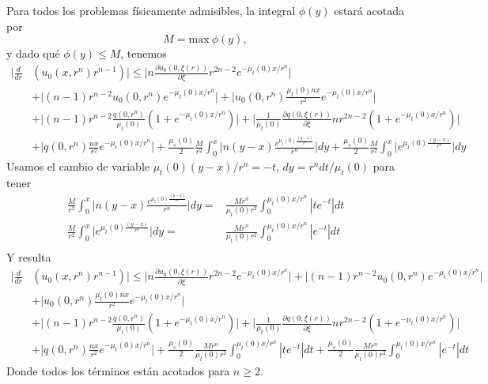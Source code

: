 Para todos los problemas físicamente admisibles, la 
integral $\phi(y)$ estará acotada por
\begin{equation}
M=\text{max}~\phi(y),
\end{equation}
y dado qué $\phi(y)\leq M$, tenemos
\begin{equation}
\begin{split}
 \Bigg| \frac{d }{dr}& \left( u_0(x,r^n) r^{n-1} \right) \Bigg| \leq 
 \Bigg| n\frac{\partial u_0(0,\xi(r))}{\partial \xi}r^{2n-2}e^{-\mu_t(0)x/r^n}\Bigg|\\
&+\Bigg| (n-1) r^{n-2}u_0(0,r^n)e^{-\mu_t(0)x/r^n}\Bigg| +\Bigg|u_0(0,r^n)\frac{\mu_t(0)nx}{r^{2}}e^{-\mu_t(0)x/r^n}\Bigg|\\
& + \Bigg|(n-1)r^{n-2}\frac{q(0,r^n)}{\mu_t(0)} \left( 1+e^{-\mu_t(0)x/r^n} \right)\Bigg|+
\Bigg|\frac{1}{\mu_t(0)}\frac{\partial q(0,\xi(r))}{\partial \xi} nr^{2n-2} (1+e^{-\mu_t(0)x/r^n})\Bigg|\\&+\Bigg|q(0,r^n)\frac{nx}{r^{2}}e^{-\mu_t(0)x/r^n}\Bigg|+\frac{\mu_s(0)}{2}\frac{M}{r^2}  \int_0^{x} \Bigg| n(y-x) \frac{e^{\mu_t(0)\frac{(y-x)}{r^n}}}{r^n}\Bigg| dy 
+ \frac{\mu_s(0)}{2} \frac{M}{r^2} \int_0^{x} \Bigg| e^{\mu_t(0)\frac{(y-x)}{r^n}} \Bigg| dy 
\end{split}
\label{eq:bounding2}
\end{equation}
Usamos el cambio de variable $\mu_t(0)(y-x)/r^n=-t$, $dy=r^n dt/\mu_t(0)$ para tener
\begin{equation}
\begin{split}
\frac{M}{r^2}  \int_0^{x} \Bigg| n(y-x) \frac{e^{\mu_t(0)\frac{(y-x)}{r^n}}}{r^n}\Bigg| dy=&\frac{M r^n}{\mu_t(0) r^2}  \int_0^{\mu_t(0)x/r^n} | te^{-t} |dt \\
\frac{M}{r^2} \int_0^{x} \Bigg| e^{\mu_t(0)\frac{(y-x)}{r^n}} \Bigg| dy 
=&\frac{M r^n}{\mu_t(0) r^2}  \int_0^{\mu_t(0) x/r^n} |e^{-t}|dt \\
\end{split}
\label{eq:bounding2aux}
\end{equation}
Y resulta
\begin{equation}
\begin{split}
 \Bigg| \frac{d }{dr}& \left( u_0(x,r^n) r^{n-1} \right) \Bigg| \leq 
 \Bigg| n\frac{\partial u_0(0,\xi(r))}{\partial \xi}r^{2n-2}e^{-\mu_t(0)x/r^n}\Bigg| +\Bigg| (n-1) r^{n-2}u_0(0,r^n)e^{-\mu_t(0)x/r^n}\Bigg|\\
& +\Bigg|u_0(0,r^n)\frac{\mu_t(0)nx}{r^{2}}e^{-\mu_t(0)x/r^n}\Bigg|\\
& + \Bigg|(n-1)r^{n-2}\frac{q(0,r^n)}{\mu_t(0)} \left( 1+e^{-\mu_t(0)x/r^n} \right)\Bigg|+
\Bigg|\frac{1}{\mu_t(0)}\frac{\partial q(0,\xi(r))}{\partial \xi} nr^{2n-2} (1+e^{-\mu_t(0)x/r^n})\Bigg|\\&+\Bigg|q(0,r^n)\frac{nx}{r^{2}}e^{-\mu_t(0)x/r^n}\Bigg|+\frac{\mu_s(0)}{2}\frac{M r^n}{\mu_t(0) r^2}  \int_0^{\mu_t(0)x/r^n} | te^{-t} |dt 
+ \frac{\mu_s(0)}{2} \frac{M r^n}{\mu_t(0)r^2}  \int_0^{\mu_t(0)x/r^n} |e^{-t}|dt
\end{split}
\label{eq:bounding2}
\end{equation}
Donde todos los términos están acotados para $n\geq 2$.


